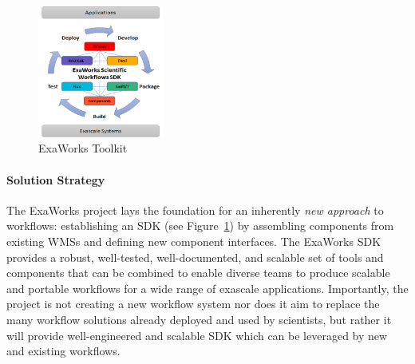 \begin{figure}
\begin{center}
    \includegraphics[width=0.37\textwidth]{projects/2.3.5-Ecosystem/2.3.5.10-ExaWorks/exaworks-circle.png}
  \end{center}
  \vspace{-0.25in}
  \caption{ExaWorks Toolkit\label{fig:arch}}
\end{figure} 

\paragraph{Solution Strategy}
The ExaWorks project lays the foundation for an inherently
\textit{new approach} to workflows: establishing an SDK (see
Figure~\ref{fig:arch}) by assembling components from existing WMSs
and defining new component interfaces. 
The ExaWorks SDK provides a robust, well-tested, well-documented,
and scalable set of tools and components that can be combined to enable diverse teams to
produce scalable and portable workflows for a wide range of exascale
applications. Importantly, the project is not creating a new workflow system
nor does it aim to replace the many workflow solutions already deployed
and used by scientists, but rather it will provide well-engineered and
scalable SDK which can be leveraged by new and existing workflows.




